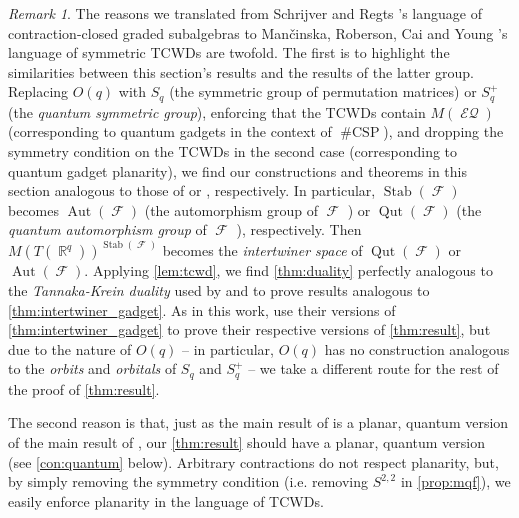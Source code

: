 \documentclass{article}
\theoremstyle{remark}
\newtheorem{remark}{Remark}[section]
\theoremstyle{definition}
\DeclareMathOperator{\rr}{\mathbb{R}}
\DeclareMathOperator{\fc}{\mathcal{F}}
\DeclareMathOperator{\stab}{Stab}
\DeclareMathOperator{\csp}{\#CSP}
\DeclareMathOperator{\qut}{Qut}
\DeclareMathOperator{\aut}{Aut}
\DeclareMathOperator{\eq}{\mathcal{EQ}}
\begin{document}
\begin{remark}
    \label{rem:duality}
    The reasons we translated from 
    Schrijver and Regts \cite{schrijver_tensor_2008, regts_rank_2012}'s language of
    contraction-closed graded subalgebras to
    Man\v{c}inska, Roberson, Cai and Young
    \cite{planar, cai_planar_2023, young2022equality}'s language of symmetric TCWDs are twofold. 
    The first is to highlight the similarities
    between this section's results and the results of the latter group. 
Replacing $O(q)$ with $S_q$ (the symmetric group of permutation matrices) or $S^+_q$ 
    (the \emph{quantum symmetric group}), enforcing that
    the TCWDs contain $M(\eq)$ (corresponding to quantum gadgets in the context of $\csp$), 
    and dropping the symmetry condition on the TCWDs 
    in the second case (corresponding to quantum gadget planarity), we find our constructions 
    and theorems in this section analogous to those of
    \cite{young2022equality} or \cite{planar, cai_planar_2023}, respectively. In particular, 
    $\stab(\fc)$ becomes $\aut(\fc)$ (the automorphism group of $\fc$ 
    \cite{young2022equality}) or $\qut(\fc)$ (the \emph{quantum automorphism group} of $\fc$
    \cite{planar, cai_planar_2023}), respectively. Then
    $M(T(\rr^q))^{\stab(\fc)}$ becomes the
    \emph{intertwiner space} of $\qut(\fc)$ or $\aut(\fc)$. Applying \autoref{lem:tcwd},
    we find \autoref{thm:duality} perfectly analogous to the
    \emph{Tannaka-Krein duality} used by \cite{young2022equality} and \cite{planar, cai_planar_2023}
    to prove results analogous to \autoref{thm:intertwiner_gadget}.
    As in this work, \cite{planar,cai_planar_2023,young2022equality} use their versions of
    \autoref{thm:intertwiner_gadget} to prove their respective versions of \autoref{thm:result}, but
    due to the nature of $O(q)$ -- in particular, $O(q)$ has no construction analogous to the
    \emph{orbits} and \emph{orbitals} of $S_q$ and $S_q^+$ -- we take a different route for the rest
    of the proof of \autoref{thm:result}.

    The second reason is that, just as the main result of \cite{cai_planar_2023} is a planar, quantum
    version
    of the main result of \cite{young2022equality}, our \autoref{thm:result} should have a planar, 
    quantum
    version (see \autoref{con:quantum} below). Arbitrary contractions do not respect planarity, but,
    by simply removing the symmetry condition (i.e. removing $S^{2,2}$ in \autoref{prop:mqf}), 
    we easily enforce planarity in the language of TCWDs.
\end{remark}
\end{document}
